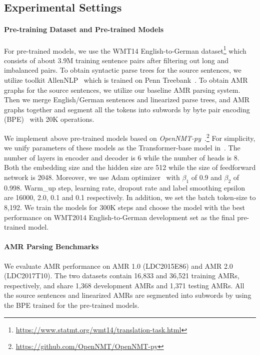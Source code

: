 \documentclass[11pt,a4paper]{article}
\newcommand{\ignore}[1]{}
\begin{document}
\subsection{Experimental Settings}
\label{sect:setting}
\paragraph{Pre-training Dataset and Pre-trained Models} 

For pre-trained models, we use the WMT14 English-to-German dataset\footnote{\url{https://www.statmt.org/wmt14/translation-task.html}} which consists of about 3.9M training sentence pairs after filtering out long and imbalanced pairs. To obtain syntactic parse trees for the source sentences, we utilize toolkit AllenNLP~\citep{gardner_etal_acl_2017} which is trained on Penn Treebank~\cite{marcus_etal_cl_1993}. To obtain AMR graphs for the source sentences, we utilize our baseline AMR parsing system. Then we merge English/German sentences and linearized parse trees, and AMR graphs together and segment all the tokens into subwords by byte pair encoding (BPE)~\cite{sennrich_etal_acl_2016} with 20K operations. 

We implement above pre-trained models based on \textit{OpenNMT-py}~\cite{klein_etal_acl_2017}.\footnote{\url{https://github.com/OpenNMT/OpenNMT-py}} For simplicity, we unify parameters of these models as the Transformer-base model in~\citet{vaswani_etal_nips_2017}. The number of layers in encoder and decoder is 6 while the number of heads\ignore{ for transformer attention} is 8. Both the embedding size and the hidden size are 512 while the size of feedforward network is 2048. Moreover, we use Adam optimizer~\cite{kingma_ba_iclr_2015} with $\beta_1$ of 0.9 and $\beta_2$ of 0.998. Warm\_up step, learning rate, dropout rate and label smoothing epsilon are 16000, 2.0, 0.1 and 0.1 respectively. In addition, we set the batch token-size to 8,192. We train the models for 300K steps and choose the model with the best performance on WMT2014 English-to-German development set as the final pre-trained model.

\paragraph{AMR Parsing Benchmarks}
We evaluate AMR performance on AMR 1.0 (LDC2015E86) and AMR 2.0 (LDC2017T10). The two datasets contain 16,833 and 36,521 training AMRs, respectively, and share 1,368 development AMRs and 1,371 testing AMRs. All the source sentences and linearized AMRs are segmented into subwords by using the BPE trained for the pre-trained models. 
\end{document}
